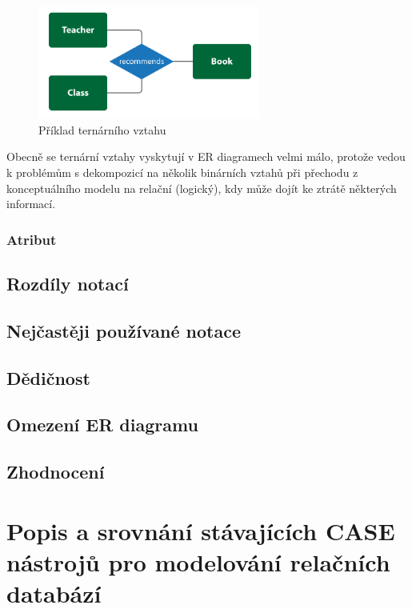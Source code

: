 \documentclass[czech,bachelor,public,dept460,male,oneside]{diploma}
\begin{document}
	\begin{figure}[!h]
		\centering
		\includegraphics[width=0.65\textwidth]{Figures/TernaryRelationship}
		\caption{Příklad ternárního vztahu}
	\end{figure}

	Obecně se ternární vztahy vyskytují v ER diagramech velmi málo, protože vedou k problémům s dekompozicí na několik binárních vztahů při přechodu z konceptuálního modelu na relační (logický), kdy může dojít ke ztrátě některých informací.
	
	\subsubsection{Atribut}
	
	\subsection{Rozdíly notací}
	
	\subsection{Nejčastěji používané notace} %
	
	\subsection{Dědičnost} %
	
	\subsection{Omezení ER diagramu}
	
	\subsection{Zhodnocení}

\newpage
\section{Popis a srovnání stávajících CASE nástrojů pro modelování relačních databází}
\end{document}
